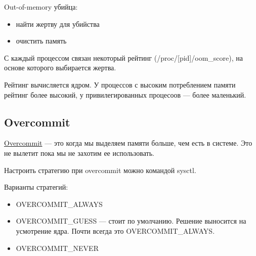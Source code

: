 Out-of-memory убийца:
\begin{itemize}
	\item найти жертву для убийства
	\item очистить память
\end{itemize}

С каждый процессом связан некоторый рейтинг (/proc/[pid]/oom\_score), на основе которого
выбирается жертва.

Рейтинг вычисляется ядром. У процессов с высоким потреблением памяти рейтинг более
высокий, у привилегированных процесоов --- более маленький.

\subsection{Overcommit}

\begin{Def}
	\underline{Overcommit} --- это когда мы выделяем памяти больше, чем есть в системе.
	Это не вылетит пока мы не захотим ее использовать.
\end{Def}

Настроить стратегию при overcommit можно командой sysctl. 

Варианты стратегий:
\begin{itemize}
	\item OVERCOMMIT\_ALWAYS
	\item OVERCOMMIT\_GUESS --- стоит по умолчанию. Решение выносится на
	усмотрение ядра. Почти всегда это OVERCOMMIT\_ALWAYS.
	\item OVERCOMMIT\_NEVER
\end{itemize}